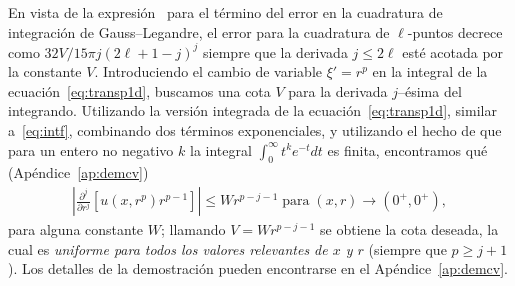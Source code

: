 En vista de la expresión~\cite[p. 77]{Trefethen2008} 
para el término del error en la cuadratura de integración 
de Gauss--Legandre, el error para la cuadratura de $\ell$-puntos 
decrece como $32V/15\pi j (2\ell+1-j)^j$ siempre que la derivada 
$j \leq 2\ell$ esté acotada por la constante $V$. 
Introduciendo el cambio de variable  $\xi'=r^p$ en la integral 
de la ecuación~\eqref{eq:transp1d}, buscamos una cota $V$ 
para la derivada $j$--ésima del integrando. 
Utilizando la versión integrada de la ecuación~\eqref{eq:transp1d}, 
similar a~\eqref{eq:intf}, combinando dos términos exponenciales, 
y utilizando el hecho de que para un entero no negativo $k$ 
la integral $\int_0^\infty t^k e^{-t} dt$ es finita, 
encontramos qué (Apéndice~\ref{ap:demcv})
\begin{equation}
\begin{split}
\left | \frac{\partial^j }{\partial r^j}\left[ u(x,r^p) r^{p-1}\right]
\right|\leq W r^{p-j-1}\; \text{para}  \; (x,r) \to (0^+,0^+),
\end{split}
\label{eq:boundedderblayer}
\end{equation}
para alguna constante $W$; llamando $V = W r^{p-j-1}$  
se obtiene la cota deseada, la cual es {\em uniforme 
para todos los valores relevantes de $x$ y $r$ } (siempre que 
$p \ge j+1$). Los 
detalles de la demostración pueden encontrarse en el Apéndice~\ref{ap:demcv}.

